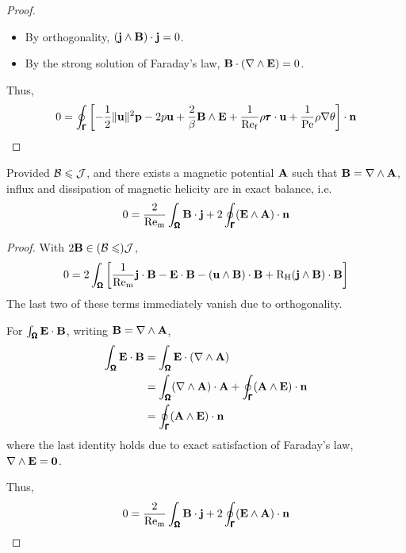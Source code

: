 \begin{proof}
\begin{itemize}
            \item  By orthogonality, $(\mathbf{j}\wedge\mathbf{B})\cdot\mathbf{j}  =  0$.
            \item  By the strong solution of Faraday's law, $\mathbf{B}\cdot(\nabla\wedge\mathbf{E})  =  0$.
        \end{itemize}
        Thus,
        \begin{equation}
            0  =  \oint_{\pmb{\mathsf{\Gamma}}}\left[- \frac{1}{2}\|\mathbf{u}\|^{2}\mathbf{p} - 2p\mathbf{u} + \frac{2}{\beta}\mathbf{B}\wedge\mathbf{E} + \frac{1}{\mathrm{Re}_{\mathrm{f}}}\rho\pmb{\mathsf{\tau}}\cdot\mathbf{u} + \frac{1}{\mathrm{Pe}}\rho\nabla\theta\right]\cdot\mathbf{n}
        \end{equation}
    \end{proof}
    
    \begin{theorem}
        Provided $\mathcal{B}  \leqslant  \mathcal{J}$, and there exists a magnetic potential $\mathbf{A}$ such that $\mathbf{B}  =  \nabla\wedge\mathbf{A}$, influx and dissipation  of magnetic helicity are in exact balance, i.e.
        \begin{equation}
            0  =  \frac{2}{\mathrm{Re}_{\mathrm{m}}}\int_{\pmb{\mathsf{\Omega}}}\mathbf{B}\cdot\mathbf{j} + 2\oint_{\pmb{\mathsf{\Gamma}}}(\mathbf{E}\wedge\mathbf{A})\cdot\mathbf{n}
        \end{equation}
    \end{theorem}
    \begin{proof}
        With $2\mathbf{B}  \in  (\mathcal{B}  \leqslant)  \mathcal{J}$,
        \begin{align}
            0  =  2\int_{\pmb{\mathsf{\Omega}}}\left[\frac{1}{\mathrm{Re}_{\mathrm{m}}}\mathbf{j}\cdot\mathbf{B} - \mathbf{E}\cdot\mathbf{B} - (\mathbf{u}\wedge\mathbf{B})\cdot\mathbf{B} + \mathrm{R}_{\mathrm{H}}(\mathbf{j}\wedge\mathbf{B})\cdot\mathbf{B}\right]
        \end{align}
        The last two of these terms immediately vanish due to orthogonality.
        
        For $\int_{\pmb{\mathsf{\Omega}}}\mathbf{E}\cdot\mathbf{B}$, writing $\mathbf{B}  =  \nabla\wedge\mathbf{A}$,
        \begin{align}
            \int_{\pmb{\mathsf{\Omega}}}\mathbf{E}\cdot\mathbf{B}  &=  \int_{\pmb{\mathsf{\Omega}}}\mathbf{E}\cdot(\nabla\wedge\mathbf{A})  \\
            &=  \int_{\pmb{\mathsf{\Omega}}}(\nabla\wedge\mathbf{A})\cdot\mathbf{A} + \oint_{\pmb{\mathsf{\Gamma}}}(\mathbf{A}\wedge\mathbf{E})\cdot\mathbf{n}  \\
            &=  \oint_{\pmb{\mathsf{\Gamma}}}(\mathbf{A}\wedge\mathbf{E})\cdot\mathbf{n}
        \end{align}
        where the last identity holds due to exact satisfaction of Faraday's law, $\nabla\wedge\mathbf{E}  =  \mathbf{0}$.
        
        Thus,
        \begin{equation}
            0  =  \frac{2}{\mathrm{Re}_{\mathrm{m}}}\int_{\pmb{\mathsf{\Omega}}}\mathbf{B}\cdot\mathbf{j} + 2\oint_{\pmb{\mathsf{\Gamma}}}(\mathbf{E}\wedge\mathbf{A})\cdot\mathbf{n}
        \end{equation}
    \end{proof}

